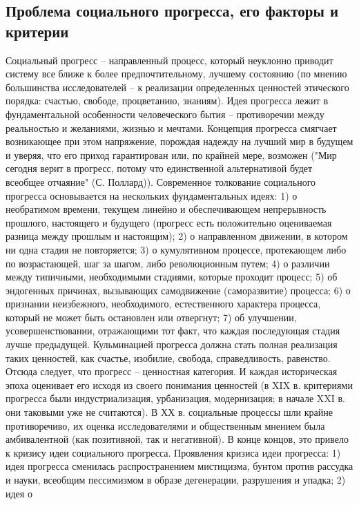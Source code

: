 \documentclass[12pt]{article}
\begin{document}
\subsection{Проблема социального прогресса, его факторы и критерии}
Социальный  прогресс  –  направленный  процесс,  который  неуклонно  приводит  систему  все  ближе  к  более
предпочтительному,  лучшему  состоянию  (по  мнению  большинства  исследователей  –  к  реализации
определенных ценностей этического порядка: счастью, свободе, процветанию, знаниям).
Идея  прогресса  лежит  в  фундаментальной  особенности  человеческого  бытия  –  противоречии  между
реальностью  и  желаниями,  жизнью  и  мечтами.  Концепция  прогресса  смягчает  возникающее  при  этом
напряжение, порождая надежду на лучший мир в будущем и уверяя, что его приход гарантирован или, по
крайней  мере,  возможен  ("Мир  сегодня  верит  в  прогресс,  потому  что  единственной  альтернативой  будет
всеобщее отчаяние" (С. Поллард)).
Современное толкование социального прогресса основывается на нескольких фундаментальных идеях: 1) о
необратимом времени, текущем линейно и обеспечивающем непрерывность прошлого, настоящего и будущего
(прогресс  есть  положительно  оцениваемая  разница  между  прошлым  и  настоящим);  2)  о  направленном
движении, в котором ни одна стадия не повторяется; 3) о кумулятивном процессе, протекающем либо по
возрастающей, шаг за шагом, либо революционным путем; 4) о различии между типичными, необходимыми
стадиями, которые проходит процесс; 5) об эндогенных причинах, вызывающих самодвижение (саморазвитие)
процесса; 6) о признании неизбежного, необходимого, естественного характера процесса, который не может
быть остановлен или отвергнут; 7) об улучшении, усовершенствовании, отражающими тот факт, что каждая
последующая стадия лучше предыдущей.
Кульминацией прогресса должна стать полная реализация таких ценностей, как счастье, изобилие, свобода,
справедливость, равенство. Отсюда следует, что прогресс – ценностная категория. И каждая историческая эпоха
оценивает его исходя из своего понимания ценностей (в XIX в. критериями прогресса были индустриализация,
урбанизация, модернизация; в начале XXI в. они таковыми уже не считаются).
В  ХХ  в.  социальные  процессы  шли  крайне  противоречиво,  их  оценка  исследователями  и  общественным
мнением была амбивалентной (как позитивной, так и негативной). В конце концов, это привело к кризису идеи
социального прогресса.
Проявления  кризиса  идеи  прогресса:  1)  идея  прогресса  сменилась  распространением  мистицизма,  бунтом
против  рассудка  и  науки,  всеобщим  пессимизмом  в  образе  дегенерации,  разрушения  и  упадка;  2)  идея  о
\end{document}
